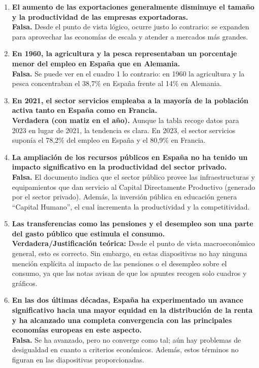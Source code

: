 \begin{enumerate}[label=\arabic*., series=preguntas]
    \item \textbf{El aumento de las exportaciones generalmente disminuye el tamaño y la productividad de las empresas exportadoras.} \\
    \textbf{Falsa.} Desde el punto de vista lógico, ocurre justo lo contrario: se expanden para aprovechar las economías de escala y atender a mercados más grandes.

    \item \textbf{En 1960, la agricultura y la pesca representaban un porcentaje menor del empleo en España que en Alemania.} \\
    \textbf{Falsa.} Se puede ver en el cuadro 1 lo contrario: en 1960 la agricultura y la pesca concentraban el 38,7\% en España frente al 14\% en Alemania.

    \item \textbf{En 2021, el sector servicios empleaba a la mayoría de la población activa tanto en España como en Francia.} \\
    \textbf{Verdadera (con matiz en el año).} Aunque la tabla recoge datos para 2023 en lugar de 2021, la tendencia es clara. En 2023, el sector servicios suponía el 78,2\% del empleo en España y el 80,9\% en Francia.

    \item \textbf{La ampliación de los recursos públicos en España no ha tenido un impacto significativo en la productividad del sector privado.} \\
    \textbf{Falsa.} El documento indica que el sector público provee las infraestructuras y equipamientos que dan servicio al Capital Directamente Productivo (generado por el sector privado). Además, la inversión pública en educación genera ``Capital Humano'', el cual incrementa la productividad y la competitividad.

    \item \textbf{Las transferencias como las pensiones y el desempleo son una parte del gasto público que estimula el consumo.} \\
    \textbf{Verdadera/Justificación teórica:} Desde el punto de vista macroeconómico general, esto es correcto. Sin embargo, en estas diapositivas no hay ninguna mención explícita al impacto de las pensiones o el desempleo sobre el consumo, ya que las notas avisan de que los apuntes recogen solo cuadros y gráficos.

    \item \textbf{En las dos últimas décadas, España ha experimentado un avance significativo hacia una mayor equidad en la distribución de la renta y ha alcanzado una completa convergencia con las principales economías europeas en este aspecto.} \\
    \textbf{Falsa.} Se ha avanzado, pero no converge como tal; aún hay problemas de desigualdad en cuanto a criterios económicos. Además, estos términos no figuran en las diapositivas proporcionadas.


\end{enumerate}
